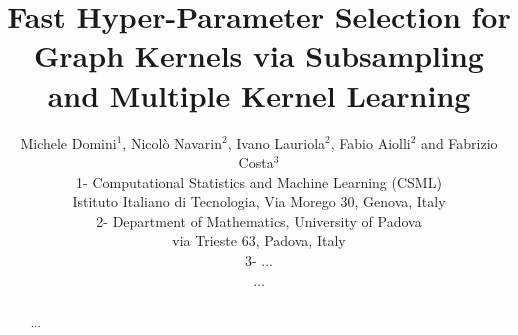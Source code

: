 \documentclass{esannV2}
\newcommand{\1}{{\bf 1}}
\begin{document}
\title{Fast Hyper-Parameter Selection for Graph Kernels via Subsampling and Multiple Kernel Learning}

\author{Michele Domini$^1$, Nicol\`o Navarin$^2$, Ivano Lauriola$^2$, Fabio Aiolli$^2$ and Fabrizio Costa$^3$
%
%
\vspace{.3cm}\\
%
1- Computational Statistics and Machine Learning (CSML) \\
Istituto Italiano di Tecnologia, Via Morego 30, Genova, Italy
\vspace{.1cm}\\
2- Department of Mathematics, University of Padova\\
via Trieste 63, Padova, Italy
\vspace{.1cm}\\
3- ... \\
...
}

%

\maketitle


\begin{abstract}
...
\end{abstract}
\end{document}
